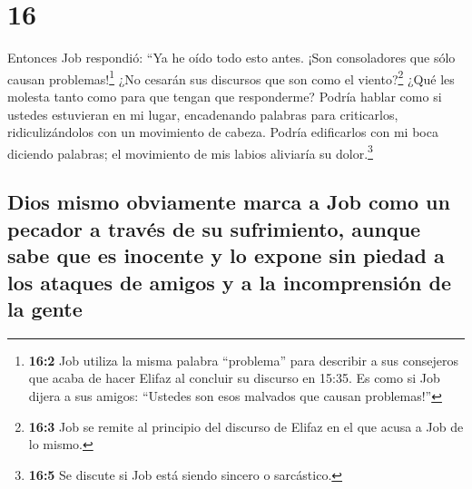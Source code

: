\hypertarget{section-15}{%
\section{16}\label{section-15}}

 Entonces Job respondió:  ``Ya he oído todo
esto antes. ¡Son consoladores que sólo causan problemas!\footnote{\textbf{16:2}
  Job utiliza la misma palabra ``problema'' para describir a sus
  consejeros que acaba de hacer Elifaz al concluir su discurso en 15:35.
  Es como si Job dijera a sus amigos: ``Ustedes son esos malvados que
  causan problemas!''}  ¿No cesarán sus discursos que son
como el viento?\footnote{\textbf{16:3} Job se remite al principio del
  discurso de Elifaz en el que acusa a Job de lo mismo.} ¿Qué les
molesta tanto como para que tengan que responderme? 
Podría hablar como si ustedes estuvieran en mi lugar, encadenando
palabras para criticarlos, ridiculizándolos con un movimiento de cabeza.
 Podría edificarlos con mi boca diciendo palabras; el
movimiento de mis labios aliviaría su dolor.\footnote{\textbf{16:5} Se
  discute si Job está siendo sincero o sarcástico.}

\hypertarget{dios-mismo-obviamente-marca-a-job-como-un-pecador-a-travuxe9s-de-su-sufrimiento-aunque-sabe-que-es-inocente-y-lo-expone-sin-piedad-a-los-ataques-de-amigos-y-a-la-incomprensiuxf3n-de-la-gente}{%
\subsection{Dios mismo obviamente marca a Job como un pecador a través
de su sufrimiento, aunque sabe que es inocente y lo expone sin piedad a
los ataques de amigos y a la incomprensión de la
gente}\label{dios-mismo-obviamente-marca-a-job-como-un-pecador-a-travuxe9s-de-su-sufrimiento-aunque-sabe-que-es-inocente-y-lo-expone-sin-piedad-a-los-ataques-de-amigos-y-a-la-incomprensiuxf3n-de-la-gente}}

